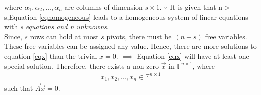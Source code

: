 \documentclass[journal,12pt,twocolumn]{IEEEtran}
\begin{document}
where $\alpha_1,\alpha_2,\dots,\alpha_n$ are columns of dimension $s\times1$.\newline
$\because$ It is given that n$>$s,\newline Equation \eqref{eqhomogeneous} leads to a homogeneous system of linear equations with \textit{s equations and n unknowns}.\\
Since, $s$ rows can hold at most $s$ pivots, there must be $(n-s)$ free variables.\newline
These free variables can be assigned any value. Hence, there are more solutions to equation \eqref{eqx} than the trivial $x=0$.\newline
$\implies$ Equation \eqref{eqx} will have at least one special solution. \newline
Therefore, there exists a non-zero $\vec{x}$ in $\mathbb{F}^{n\times1}$, where
\begin{align}
     x_1,x_2,\dots,x_n \in \mathbb{F}^{n\times1}
\end{align} such that $\vec{A}\vec{x}=0$.\newline
\end{document}
